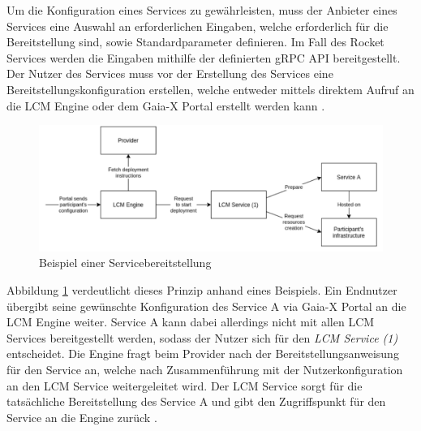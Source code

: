 Um die Konfiguration eines Services zu gewährleisten, muss der Anbieter eines Services eine Auswahl
an erforderlichen Eingaben, welche erforderlich für die Bereitstellung sind, sowie Standardparameter definieren.
Im Fall des Rocket Services werden die Eingaben mithilfe der definierten gRPC API bereitgestellt.
Der Nutzer des Services muss vor der Erstellung des Services eine Bereitstellungskonfiguration erstellen,
welche entweder mittels direktem Aufruf an die \ac{LCM} Engine oder dem Gaia-X Portal erstellt werden kann \cite{ORC2021}.

\begin{figure}[h]
  \centering
  \includegraphics[width=\textwidth]{gfx/chapters/4_gaia-X/example_deployment.png}
  \caption{Beispiel einer Servicebereitstellung}
  \label{fig:gaia-x-example_deployment}
\end{figure}
Abbildung \ref{fig:gaia-x-example_deployment} verdeutlicht dieses Prinzip anhand eines Beispiels.
Ein Endnutzer übergibt seine gewünschte Konfiguration des Service A via Gaia-X Portal an die \ac{LCM} Engine weiter.
Service A kann dabei allerdings nicht mit allen LCM Services bereitgestellt werden,
sodass der Nutzer sich für den \emph{\ac{LCM} Service (1)} entscheidet.
Die Engine fragt beim Provider nach der Bereitstellungsanweisung für den Service an,
welche nach Zusammenführung mit der Nutzerkonfiguration an den \ac{LCM} Service weitergeleitet wird.
Der \ac{LCM} Service sorgt für die tatsächliche Bereitstellung des Service A
und gibt den Zugriffspunkt für den Service an die Engine zurück \cite{ORC2021}.
